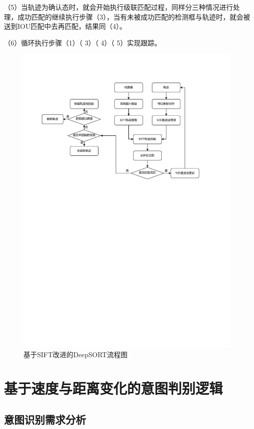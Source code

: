 （5）当轨迹为确认态时，就会开始执行级联匹配过程，同样分三种情况进行处理，成功匹配的继续执行步骤（3），当有未被成功匹配的检测框与轨迹时，就会被送到IOU匹配中去再匹配，结果同（4）。
 
（6）循环执行步骤（1）（ 3）（ 4）（ 5）实现跟踪。

\begin{figure}[H]
	\centering
	\includegraphics[width=1.0\textwidth]{images/SIFT改进流程图.pdf}  %
	\caption{基于SIFT改进的DeepSORT流程图}
	\label{fig:SIFT}  %
\end{figure}



\section{基于速度与距离变化的意图判别逻辑}
\subsection{意图识别需求分析}

